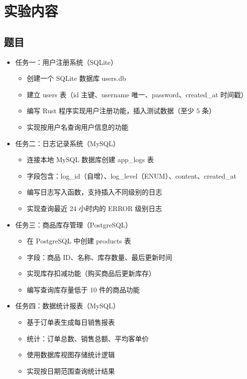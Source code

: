 \documentclass[12pt,a4paper]{ctexart}
\begin{document}
\section{实验内容}
\subsection{题目}
\begin{itemize}
	\item 任务一：用户注册系统（SQLite）
	\begin{itemize}
		\item 创建一个 SQLite 数据库 users.db
		\item 建立 users 表（id 主键、username 唯一、password、created\_at 时间戳）
		\item 编写 Rust 程序实现用户注册功能，插入测试数据（至少 5 条）
		\item 实现按用户名查询用户信息的功能
	\end{itemize}
	\item 任务二：日志记录系统（MySQL）
	\begin{itemize}
		\item 连接本地 MySQL 数据库创建 app\_logs 表
		\item 字段包含：log\_id（自增）、log\_level（ENUM）、content、created\_at
		\item 编写日志写入函数，支持插入不同级别的日志
		\item 实现查询最近 24 小时内的 ERROR 级别日志
	\end{itemize}
	\item 任务三：商品库存管理（PostgreSQL）
	\begin{itemize}
		\item 在 PostgreSQL 中创建 products 表
		\item 字段：商品 ID、名称、库存数量、最后更新时间
		\item 实现库存扣减功能（购买商品后更新库存）
		\item 编写查询库存量低于 10 件的商品功能
	\end{itemize}
	\item 任务四：数据统计报表（MySQL）
	\begin{itemize}
		\item 基于订单表生成每日销售报表
		\item 统计：订单总数、销售总额、平均客单价
		\item 使用数据库视图存储统计逻辑
		\item 实现按日期范围查询统计结果
	\end{itemize}
\end{itemize}
\end{document}
